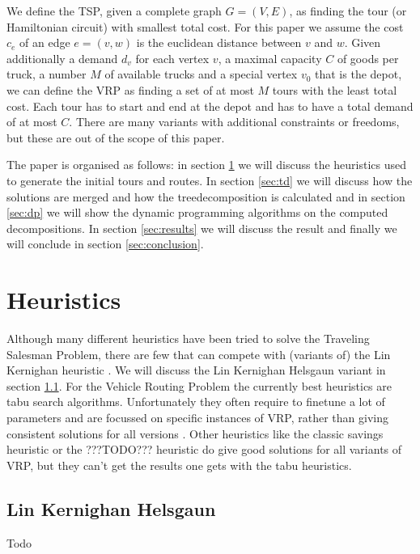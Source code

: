 \documentclass[12pt]{article}
\begin{document}
We define the TSP, given a complete graph $G = (V, E)$, as finding the tour (or Hamiltonian
circuit) with smallest total cost. For this paper we assume the cost $c_e$ of an edge $e = (v, w)$
is the euclidean distance between $v$ and $w$.
Given additionally a demand $d_v$ for each vertex $v$, a maximal capacity $C$ of goods per truck, a
number $M$ of available trucks and a special vertex $v_0$ that is the depot, we can define the VRP
as finding a set of at most $M$ tours with the least total cost. Each tour has to start and end at
the depot and has to have a total demand of at most $C$.
There are many variants with additional constraints or freedoms, but these are out of the scope of
this paper.

The paper is organised as follows: in section \ref{sec:heuristics} we will discuss the heuristics
used to generate the initial tours and routes. In section \ref{sec:td} we will discuss how the
solutions are merged and how the treedecomposition is calculated and in section \ref{sec:dp} we will
show the dynamic programming algorithms on the computed decompositions. In section \ref{sec:results}
we will discuss the result and finally we will conclude in section \ref{sec:conclusion}.



%
%
\section{Heuristics}
\label{sec:heuristics}
Although many different heuristics have been tried to solve the Traveling Salesman Problem, there
are few that can compete with (variants of) the Lin Kernighan heuristic \cite{lin-kernighan}. We
will discuss the Lin Kernighan Helsgaun variant in section \ref{sec:lkh}.
For the Vehicle Routing Problem the currently best heuristics are tabu search algorithms.
Unfortunately they often require to finetune a lot of parameters and are focussed on specific
instances of VRP, rather than giving consistent solutions for all versions \cite{hmmz, where to find
a good citation for this one}. Other heuristics like the classic savings heuristic or the ???TODO???
heuristic do give good solutions for all variants of VRP, but they can't get the results one gets
with the tabu heuristics.

    \subsection{Lin Kernighan Helsgaun}
    \label{sec:lkh}
    Todo
\end{document}

